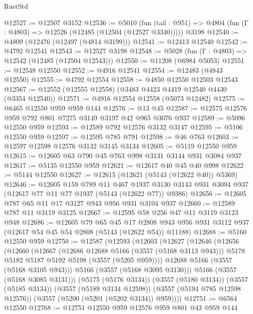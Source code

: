 \begin{lexlean}{RustStd}
\begin{coremodule}
@12527 := @12507 @3152
@12536 := @5010
    (fun (tail : @951) => @4804 (fun (Γ : @4803) => @12526 (@12485 (@12504 (@12527 @3340)))))
    @3198
@12540 := @4809 (@12476 (@12497 (@4814 @3199)))
@12541 := @12413 @12540
@12542 := @4792 @12541
@12543 := @12527 @3198
@12548 := @5028 (fun (Γ : @4803) => @12542 (@12485 (@12504 @12543)))
@12550 := @11208 (@6984 @5053)
@12551 := @12548 @12550
@12552 := @4916 @12541
@12554 := @12483 (@4843 @12550)
@12555 := @4792 @12554
@12558 := @4850 @12550 @12503 @12543
@12567 := @12552 (@12555 @12558) (@3483 @4423 @4419 @12540 @4430 (@3354 @12540))
@12571 := @4916 @12554 @12558 (@5073 @12482)
@12575 := @6465 @12550 @959 @959 @144
@12576 := @13 @45
@12587 := @12575 @12576 @959 @792 @801 @7275 @3149 @3197 @42 @965 @3076 @937
@12589 := @5096 @12550 @959
@12593 := @12589 @792 @12576 @3132 @3147
@12595 := @5106 @12550 @959
@12597 := @12595 @785 @791
@12598 := @46 @763
@12603 := @12597 @12598 @12576 @3132 @3145 @3134
@12605 := @5119 @12550 @959
@12615 := @12605 @63 @790 @45 @763 @998 @3131 @3144 @931 @3084 @937
@12617 := @5135 @12550 @959
@12621 := @12617 @40 @45 @40 @998
@12622 := @5144 @12550
@12627 := @12615 (@12621 (@5143 (@12622 @40)) @5369)
@12646 := @12605
    @159
    @789
    @11
    @467
    @1937
    @3130
    @3143
    @931
    @3094
    @937
    (@12617 @77 @11 @77 @1937 (@5143 (@12622 @77)) @9386)
@12656 := @12605 @787 @65 @11 @17 @3127 @943 @956 @931 @3104 @937
@12660 := @12589 @787 @11 @3119 @3125
@12667 := @12595 @58 @256 @47 @11 @3119 @3123 @948
@12686 := @12605
    @79
    @65
    @45
    @17
    @2808
    @943
    @956
    @931
    @3112
    @937
    (@12617 @54 @45 @54 @2808 (@5143 (@12622 @54)) @11188)
@12688 := @5160 @12550 @959
@12750 := @12587
    (@12593
      (@12603
        (@12627
          (@12646
            (@12656
              (@12660
                (@12667
                  (@12686 @12688 @5166 (@3557 (@5168 @3113 @943)))
                  @5178
                  @5182
                  @5187
                  @5192
                  @5198
                  (@3557 (@5205 @959))))
              @12688
              @5166
              (@3557 (@5168 @3105 @943)))
            @5166
            (@3557 (@5168 @3095 @3130)))
          @5166
          (@3557 (@5168 @3085 @3131)))
        (@5175 (@5176 @3134))
        (@3557 (@5180 @3134))
        (@3557 (@5185 @3134))
        (@3557 (@5189 @3134 @12598))
        (@3557 (@5194 @785 @12598 @12576))
        (@3557 (@5200 (@5201 (@5202 @3134)) @959))))
@12751 := @6564 @12550
@12768 := @12751
    @12550
    @959
    @12576
    @959
    @801
    @43
    @959
    @144

\end{coremodule}
\end{lexlean}
